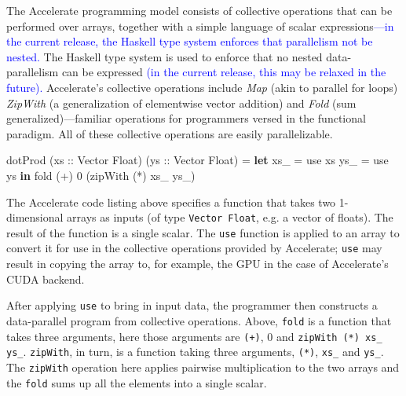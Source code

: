 \documentclass[conference]{IEEEtran}
\newcommand{\cde}[1]{{\footnotesize \tt #1}}
\newcommand{\kw}[1]{{\textbf{#1}}}
\newenvironment{mycode}
{%
  \footnotesize
  \noindent
  \begin{code}\noindent\vspace{-1mm}}
{%
  \end{code} 
}
\newcommand{\textred}[1]{\textcolor{red}{#1}}
\newcommand{\pgwrapper}[2]{\textred{#1: #2}}
\newcommand{\new}[1]{\textcolor{blue}{#1}}
\newcommand{\textred}[1]{#1}
\newcommand{\pgwrapper}[2]{}
\newcommand{\new}[1]{#1}
\newcommand{\rn}[1]{\pgwrapper{RRN}{#1}}
\begin{document}
The Accelerate programming model consists of collective 
operations that can be performed over arrays, together with a simple 
language of scalar expressions\new{---in the current release, the Haskell type system enforces that parallelism not be nested.}
The Haskell type 
system is used to enforce that no nested data-parallelism can be expressed 
\new{(in the current release, this may be relaxed in the future).}
\fi{}
Accelerate's collective operations include {\em Map} (akin to parallel
for loops) {\em ZipWith} (a generalization of elementwise vector addition) and 
{\em Fold} (sum generalized)---familiar operations for programmers versed in the functional paradigm.
All of these collective operations are easily parallelizable. 

\begin{mycode}
dotProd (xs :: Vector Float) 
        (ys :: Vector Float) = 
  \kw{let} xs\_ = use xs 
      ys\_ = use ys 
  \kw{in}  fold (+) 0 (zipWith (*) xs\_ ys\_) 
\end{mycode}

The Accelerate code listing above specifies a function that takes two 1-dimensional 
arrays as inputs (of type \cde{Vector Float}, e.g. a vector of floats). The result of the function is a single
scalar. 
The \cde{use} function is applied to an array to convert it 
for use in the collective operations provided by Accelerate;
\cde{use} 
may result in
copying the array to, for example, the GPU in the case of Accelerate's 
CUDA backend.  

After applying \cde{use} to bring in input data, the programmer then
constructs a data-parallel program from collective operations.
Above, \cde{fold} is a function that takes three arguments, 
here those arguments are \cde{(+)},  $0$ and \cde{zipWith (*) xs\_ ys\_}. 
\cde{zipWith}, in turn, is a function taking three arguments, \cde{(*)}, 
\cde{xs\_} and \cde{ys\_}. The \cde{zipWith} operation here applies pairwise 
multiplication to the two arrays and the \cde{fold} sums up all the elements 
into a single scalar. 

\end{document}
